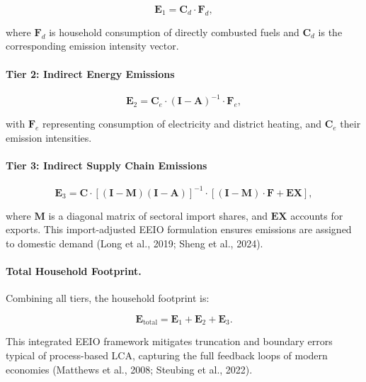 \documentclass[12pt,a4paper]{article}%
\begin{document}
\begin{equation}
\mathbf{E}_1 = \mathbf{C}_d \cdot \mathbf{F}_d,
\end{equation}

where \( \mathbf{F}_d \) is household consumption of directly combusted fuels and \( \mathbf{C}_d \) is the corresponding emission intensity vector.

\paragraph{Tier 2: Indirect Energy Emissions}

\begin{equation}
\mathbf{E}_2 = \mathbf{C}_e \cdot {(\mathbf{I} - \mathbf{A})}^{-1} \cdot \mathbf{F}_e,
\end{equation}

with \( \mathbf{F}_e \) representing consumption of electricity and district heating, and \( \mathbf{C}_e \) their emission intensities.

\paragraph{Tier 3: Indirect Supply Chain Emissions}

\begin{equation}
\mathbf{E}_3 = \mathbf{C} \cdot {\left[(\mathbf{I} - \mathbf{M})(\mathbf{I} - \mathbf{A})\right]}^{-1} \cdot \left[(\mathbf{I} - \mathbf{M}) \cdot \mathbf{F} + \mathbf{EX} \right],
\end{equation}

where \( \mathbf{M} \) is a diagonal matrix of sectoral import shares, and \( \mathbf{EX} \) accounts for exports. This import-adjusted EEIO formulation ensures emissions are assigned to domestic demand (Long et al., 2019; Sheng et al., 2024).

\paragraph{Total Household Footprint.}  
Combining all tiers, the household footprint is:

\begin{equation}
    \mathbf{E}_{\text{total}} = \mathbf{E}_1 + \mathbf{E}_2 + \mathbf{E}_3.
\end{equation}

This integrated EEIO framework mitigates truncation and boundary errors typical of process-based LCA, capturing the full feedback loops of modern economies (Matthews et al., 2008; Steubing et al., 2022).
\end{document}
